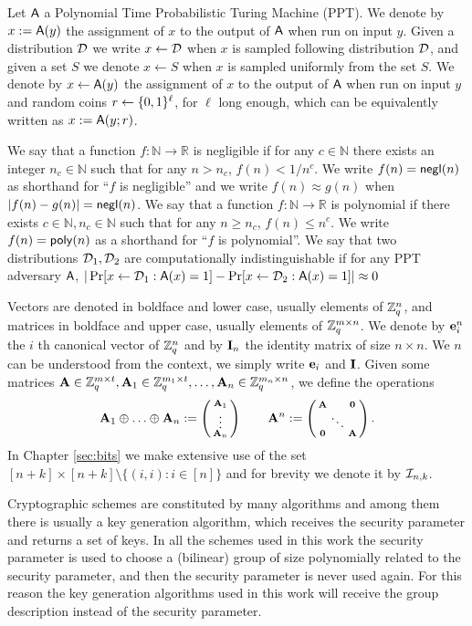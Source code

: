 Let $\mathsf{A}$ a Polynomial Time Probabilistic Turing Machine (PPT). We denote by $x:=\mathsf{A}(y)$ the assignment of $x$ to the output of $\mathsf{A}$ when run on input $y$. Given a distribution $\mathcal{D}$ we write $x\gets\mathcal{D}$ when $x$ is sampled following distribution $\mathcal{D}$, and given a set $S$ we denote $x\gets S$ when $x$ is sampled uniformly from the set $S$. We denote by $x\gets\mathsf{A}(y)$ the assignment of $x$ to the output of $\mathsf{A}$ when run on input $y$ and random coins $r\gets\{0,1\}^\ell$, for $\ell$ long enough, which can be equivalently written as $x:=\mathsf{A}(y;r)$. 

We say that a function $f:\mathbb{N}\to\mathbb{R}$ is negligible if for any $c\in\mathbb{N}$ there exists an integer $n_c\in\mathbb{N}$ such that for any $n> n_c$, $f(n)<1/n^c$. We write $f(n)=\mathsf{negl}(n)$ as shorthand for ``$f$ is negligible'' and we write $f(n)\approx g(n)$ when $|f(n)-g(n)|=\mathsf{negl}(n)$. We say that a function $f:\mathbb{N}\to\mathbb{R}$ is polynomial if there exists $c\in\mathbb{N},n_c\in\mathbb{N}$ such that for any $n\geq n_c$, $f(n)\leq n^c$. We write $f(n)=\mathsf{poly}(n)$ as a shorthand for ``$f$ is polynomial''.
We say that two distributions $\mathcal{D}_1,\mathcal{D}_2$ are computationally indistinguishable if for any PPT adversary $\mathsf{A}$, $|\Pr[x\gets\mathcal{D}_1: \mathsf{A}(x)=1]-\Pr[x\gets\mathcal{D}_2: \mathsf{A}(x)=1]|\approx 0$ 

Vectors are denoted in boldface and lower case, usually elements of $\mathbb{Z}_q^n$, and matrices in boldface and upper case, usually elements of $\mathbb{Z}_q^{m\times n}$. We denote by $\mathbf{e}_i^n$ the $i$ th canonical vector of $\mathbb{Z}_q^n$ and by $\mathbf{{I}}_{n}$ the identity matrix of size $n\times n$. We $n$ can be understood from the context, we simply write $\mathbf{e}_i$ and $\mathbf{{I}}$. Given some matrices $\mathbf{{A}}\in\mathbb{Z}_q^{m\times t},\mathbf{{A}}_1\in\mathbb{Z}_q^{m_1\times t},\ldots,\mathbf{{A}}_n\in\mathbb{Z}_q^{m_n\times n}$, we define the operations
 $$\mathbf{A}_1 \oplus \ldots \oplus \mathbf{A}_n:=\left(\begin{smallmatrix} \mathbf{A}_1 \\ \vdots \\  \mathbf{A}_n\end{smallmatrix}\right) \qquad 
\mathbf{{A}}^n:=\left(\begin{smallmatrix} \mathbf{{A}} &  & \mathbf{{0}} \\   & \ddots &   \\ \mathbf{{0}} &  & \mathbf{{A}}
\end{smallmatrix}\right).$$
In Chapter \ref{sec:bits} we make extensive use of the set $[n+k]\times[n+k]\setminus\{(i,i):i\in[n]\}$ and for brevity we denote it by $\mathcal{I}_{n,k}$.

Cryptographic schemes are constituted by many algorithms and among them there is usually a key generation algorithm, which receives the security parameter and returns a set of keys. In all the schemes used in this work the security parameter is used to choose a (bilinear) group of size polynomially related to the security parameter, and then the security parameter is never used again. For this reason the key generation algorithms used in this work will receive the group description instead of the security parameter.
